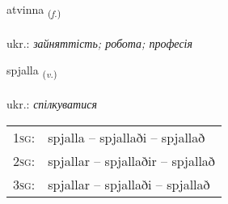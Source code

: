 \documentclass[frontgrid, backgrid]{flacards}\usepackage[]{graphicx}\usepackage[]{xcolor}
\begin{document}
\renewcommand{\blhead}{\vskip5pt {\small\bfseries\footnotesize Nafnorð | іменник }}
\renewcommand{\bcfoot}{\vskip5pt \hspace{2pt}{\small\bfseries\footnotesize 3K}}


{atvinna \small{\textsubscript{(\textit{f.})}} \\[1ex] %
\textphonetic{[aːtvɪna]} \\
ukr.: \emph{зайняттість; робота; професія} \\  [2ex]
\renewcommand*{\arraystretch}{0.8}
}

\renewcommand{\flhead}{\vskip5pt \fboxsep=0pt {\small\bfseries\footnotesize Sagnorð | дієслово}}
\renewcommand{\fcfoot}{\vskip5pt \fboxsep=0pt \hspace{2pt}{\small\bfseries\footnotesize 3K}}

\renewcommand{\blhead}{\vskip5pt {\small\bfseries\footnotesize Sagnorð | дієслово }}
\renewcommand{\bcfoot}{\vskip5pt \hspace{2pt}{\small\bfseries\footnotesize 3K}}


{spjalla \small{\textsubscript{(\textit{v.})}} \\[1ex] %
\textphonetic{[spjatla]} \\
ukr.: \emph{спілкуватися} \\  [2ex]
\renewcommand*{\arraystretch}{0.8}
\begin{tabular}{p{1cm}l}
\textsc{1sg}: & spjalla -- spjallaði -- spjallað \\ 
\textsc{2sg}: & spjallar -- spjallaðir -- spjallað \\ 
\textsc{3sg}: & spjallar -- spjallaði -- spjallað \\ 
\end{tabular}
}
\end{document}
